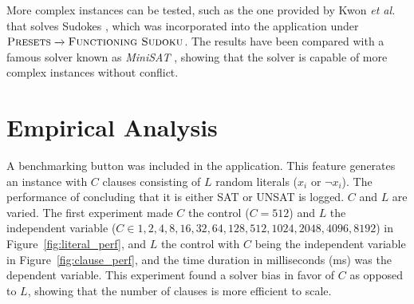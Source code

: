 \documentclass[runningheads]{llncs}
\begin{document}
More complex instances can be tested, such as the one provided by Kwon \emph{et al.} that solves Sudokes \cite{kwon2006optimized}, which was incorporated into the application under $\textsc{Presets}\xrightarrow{}\textsc{Functioning Sudoku}$. The results have been compared with a famous solver known as \emph{MiniSAT} \cite{sorensson2010minisat}, showing that the solver is capable of more complex instances without conflict.

\section{Empirical Analysis}
A benchmarking button was included in the application. This feature generates an instance with $C$ clauses consisting of $L$ random literals ($x_i$ or $\neg x_i$). The performance of concluding that it is either SAT or UNSAT is logged. $C$ and $L$ are varied. The first experiment made $C$ the control ($C=512$) and $L$ the independent variable ($C\in {1, 2, 4, 8, 16, 32, 64, 128, 512, 1024, 2048, 4096, 8192}$) in Figure~\ref{fig:literal_perf}, and $L$ the control with $C$ being the independent variable in Figure~\ref{fig:clause_perf}, and the time duration in milliseconds (ms) was the dependent variable. This experiment found a solver bias in favor of $C$ as opposed to $L$, showing that the number of clauses is more efficient to scale.
\end{document}
